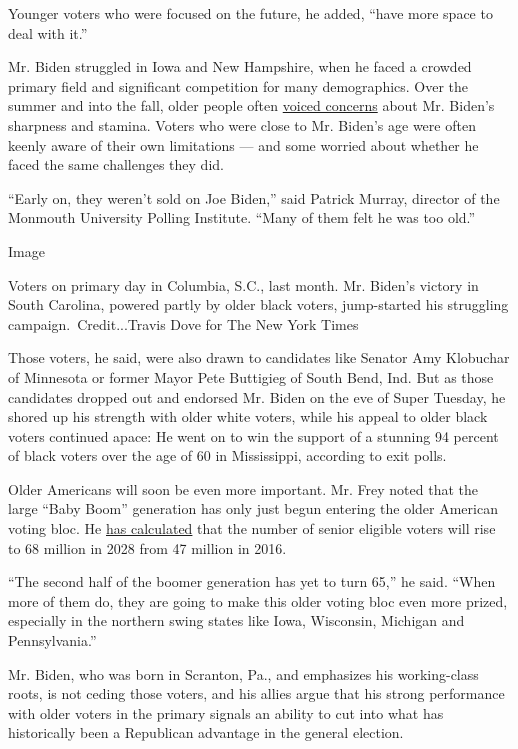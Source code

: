 Younger voters who were focused on the future, he added, ``have more
space to deal with it.''

Mr. Biden struggled in Iowa and New Hampshire, when he faced a crowded
primary field and significant competition for many demographics. Over
the summer and into the fall, older people often
\href{https://www.nytimes.com/2019/07/29/us/politics/joe-biden-age.html}{voiced
concerns} about Mr. Biden's sharpness and stamina. Voters who were close
to Mr. Biden's age were often keenly aware of their own limitations ---
and some worried about whether he faced the same challenges they did.

``Early on, they weren't sold on Joe Biden,'' said Patrick Murray,
director of the Monmouth University Polling Institute. ``Many of them
felt he was too old.''

Image

Voters on primary day in Columbia, S.C., last month. Mr. Biden's victory
in South Carolina, powered partly by older black voters, jump-started
his struggling campaign.~Credit...Travis Dove for The New York Times

Those voters, he said, were also drawn to candidates like Senator Amy
Klobuchar of Minnesota or former Mayor Pete Buttigieg of South Bend,
Ind. But as those candidates dropped out and endorsed Mr. Biden on the
eve of Super Tuesday, he shored up his strength with older white voters,
while his appeal to older black voters continued apace: He went on to
win the support of a stunning 94 percent of black voters over the age of
60 in Mississippi, according to exit polls.

Older Americans will soon be even more important. Mr. Frey noted that
the large ``Baby Boom'' generation has only just begun entering the
older American voting bloc. He
\href{https://academic.oup.com/ppar/article/28/1/9/4958149}{has
calculated} that the number of senior eligible voters will rise to 68
million in 2028 from 47 million in 2016.

``The second half of the boomer generation has yet to turn 65,'' he
said. ``When more of them do, they are going to make this older voting
bloc even more prized, especially in the northern swing states like
Iowa, Wisconsin, Michigan and Pennsylvania.''

Mr. Biden, who was born in Scranton, Pa., and emphasizes his
working-class roots, is not ceding those voters, and his allies argue
that his strong performance with older voters in the primary signals an
ability to cut into what has historically been a Republican advantage in
the general election.

